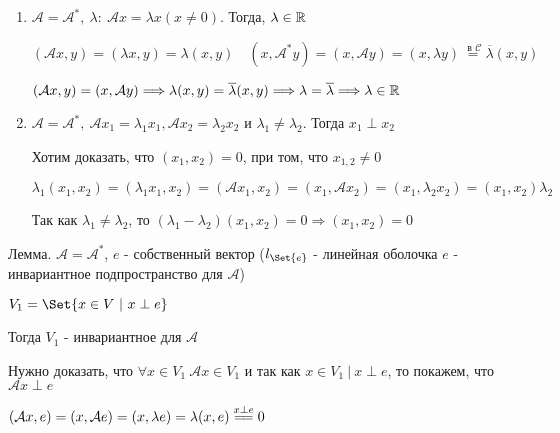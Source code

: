 \documentclass[12pt]{article}
\begin{document}
    \begin{enumerate}
        \item $\mathcal{A} = \mathcal{A}^*, \ \lambda : \ \mathcal{A}x = \lambda x (x \neq 0)$. Тогда, $\lambda \in \mathbb{R}$

        \begin{MyProof}
            $(\mathcal{A}x, y) = (\lambda x, y) = \lambda (x, y) \quad (x, \mathcal{A}^* y) = (x, \mathcal{A}y) = (x, \lambda y) \stackrel{\text{ в } \mathcal{C}}{=} \overline{\lambda} (x, y)$

            $(\mathcal{A}x, y) = (x, \mathcal{A}y) \Longrightarrow \lambda (x, y) = \overline{\lambda} (x, y) \Longrightarrow \lambda = \overline{\lambda} \Longrightarrow \lambda \in \mathbb{R}$

        \end{MyProof}

        \item $\mathcal{A} = \mathcal{A}^*, \ \mathcal{A}x_1 = \lambda_1 x_1, \mathcal{A}x_2 = \lambda_2 x_2$ и $\lambda_1 \neq \lambda_2$.
        Тогда $x_1 \perp x_2$

        \begin{MyProof}
            Хотим доказать, что $(x_1, x_2) = 0$, при том, что $x_{1,2} \neq 0$

            $\lambda_1 (x_1, x_2) = (\lambda_1 x_1, x_2) = (\mathcal{A} x_1, x_2) = (x_1, \mathcal{A} x_2) = (x_1, \lambda_2 x_2) = (x_1, x_2) \lambda_2$

            Так как $\lambda_1 \neq \lambda_2$, то $(\lambda_1 - \lambda_2) (x_1, x_2) = 0 \Longrightarrow (x_1, x_2) = 0$
        \end{MyProof}
    \end{enumerate}

    \hypertarget{lemmaabouteigenvectors}{}

    \begin{MyTheorem}
        \Ths Лемма. $\mathcal{A} = \mathcal{A}^*$, $e$ - собственный вектор ($l_{\Set{e}}$ - линейная оболочка $e$ - инвариантное подпространство для $\mathcal{A}$)

        $V_1 = \Set{x \in V \ | \ x \perp e}$

        Тогда $V_1$ - инвариантное для $\mathcal{A}$
    \end{MyTheorem}

    \begin{MyProof}
        Нужно доказать, что $\forall x \in V_1 \ \mathcal{A}x \in V_1$ и так как $x \in V_1 \ | \ x \perp e$, то
        покажем, что $\mathcal{A}x \perp e$

        $(\mathcal{A}x, e) = (x, \mathcal{A}e) = (x, \lambda e) = \lambda (x, e) \stackrel{x \perp e}{=\joinrel=} 0$
    \end{MyProof}
\end{document}
